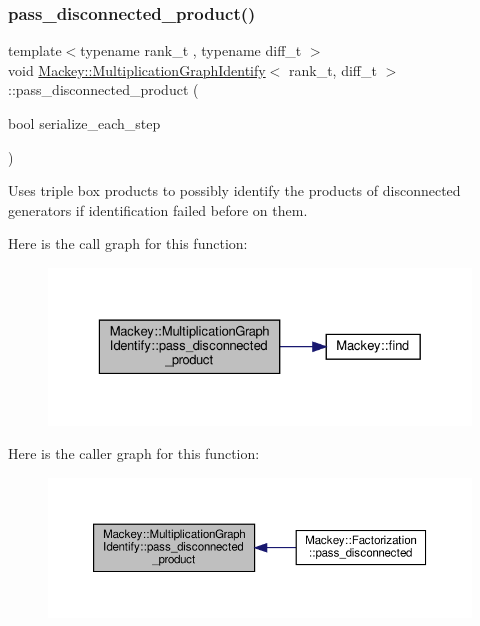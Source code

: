\subsubsection{\texorpdfstring{pass\+\_\+disconnected\+\_\+product()}{pass\_disconnected\_product()}}
{\footnotesize\ttfamily template$<$typename rank\+\_\+t , typename diff\+\_\+t $>$ \\
void \hyperlink{classMackey_1_1MultiplicationGraphIdentify}{Mackey\+::\+Multiplication\+Graph\+Identify}$<$ rank\+\_\+t, diff\+\_\+t $>$\+::pass\+\_\+disconnected\+\_\+product (\begin{DoxyParamCaption}\item[{bool}]{serialize\+\_\+each\+\_\+step }\end{DoxyParamCaption})\hspace{0.3cm}{\ttfamily [protected]}}



Uses triple box products to possibly identify the products of disconnected generators if identification failed before on them. 

Here is the call graph for this function\+:\nopagebreak
\begin{figure}[H]
\begin{center}
\leavevmode
\includegraphics[width=329pt]{classMackey_1_1MultiplicationGraphIdentify_a110991be3ba595dbf401ef4a769e4dec_cgraph}
\end{center}
\end{figure}
Here is the caller graph for this function\+:\nopagebreak
\begin{figure}[H]
\begin{center}
\leavevmode
\includegraphics[width=350pt]{classMackey_1_1MultiplicationGraphIdentify_a110991be3ba595dbf401ef4a769e4dec_icgraph}
\end{center}
\end{figure}


